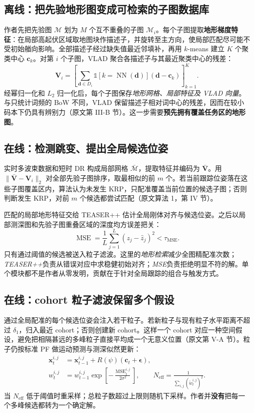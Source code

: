 \documentclass[11pt]{article}
\begin{document}
\subsection{离线：把先验地形图变成可检索的子图数据库}

作者先把先验图 $\mathcal{M}$ 划为 $M$ 个互不重叠的子图 $\mathcal{M}_i$。每个子图提取\textbf{地形梯度特征}：在局部高起伏区域取地图块作描述子，并旋转至主方向，使局部匹配尽可能不受初始艏向影响。全部描述子经过缺失值最近邻填补，再用 $k$-means 建立 $K$ 个聚类中心 $\mathbf c_k$。对第 $i$ 个子图，VLAD 聚合各描述子与其最近聚类中心的残差：
\begin{equation}
  \mathbf V_i=\left[\sum_{\mathbf d\in D_i}\mathbb{1}\!\left[k=\operatorname{NN}(\mathbf d)\right](\mathbf d-\mathbf c_k)\right]_{k=1}^{K}.
\end{equation}
经幂归一化和 $L_2$ 归一化后，每个子图保存\emph{地形网格、局部特征及 VLAD 向量}。与只统计词频的 BoW 不同，VLAD 保留描述子相对词中心的残差，因而在较小码本下仍具有辨别力（原文第 III-B 节）。这一步需要\textbf{预先拥有覆盖任务区的地形图}。

\subsection{在线：检测跳变、提出全局候选位姿}

实时多波束数据和短时 DR 构成局部网格 $\bar{\mathcal M}$，提取特征并编码为 $\bar{\mathbf V}$。用 $\|\bar{\mathbf V}-\mathbf V_i\|_2$ 对全部先验子图排序，取最相似的前 $m$ 个。若当前跟踪位姿落在这些子图覆盖区内，算法认为未发生 KRP，只配准覆盖当前位置的候选子图；否则判断发生 KRP，对前 $m$ 个候选都尝试匹配（原文算法 1，第 IV 节）。

匹配的局部地形特征交给 TEASER++ 估计全局刚体对齐与候选位姿。之后以局部测深图和先验子图重叠区域的深度均方误差把关：
\begin{equation}
  \operatorname{MSE}=\frac{1}{L}\sum_{j=1}^{L}(z_j-\hat z_j)^2<\tau_{\mathrm{MSE}}.
\end{equation}
只有通过阈值的候选被送入粒子滤波。这里的\emph{地形检索}减少全图精配准次数；\emph{TEASER++}负责从错误对应中求稳健初始对齐；\emph{MSE}负责拒绝明显不符的解。单个模块都不是作者从零发明，贡献在于针对全局跟踪的组合与触发方式。

\subsection{在线：cohort 粒子滤波保留多个假设}

通过全局配准的每个候选位姿会注入若干粒子。若新粒子与现有粒子水平距离不超过 $\delta_1$，归入最近 cohort；否则创建新 cohort。这样一个 cohort 对应一种空间假设，避免把相隔甚远的多峰粒子直接平均成一个无意义位置（原文第 V-A 节）。粒子仍按标准 PF 做运动预测与测深似然更新：
\begin{align}
  \mathbf{x}^{i,j}_t &= \mathbf{x}^{i,j}_{t-1}+R(\psi)(\mathbf c_t+\boldsymbol\epsilon),\\
  w^{i,j}_t &= w^{i,j}_{t-1}\exp\!\left[-\frac{\operatorname{MSE}^{i,j}_t}{2\sigma^2}\right],\qquad
  N_{\mathrm{eff}}=\frac{1}{\sum_{i,j}(\tilde w^{i,j}_t)^2}.
\end{align}
当 $N_{\mathrm{eff}}$ 低于阈值时重采样；总粒子数超过上限则随机下采样。作者并\textbf{没有}把每一个多峰候选都转为一个确定解。
\end{document}
